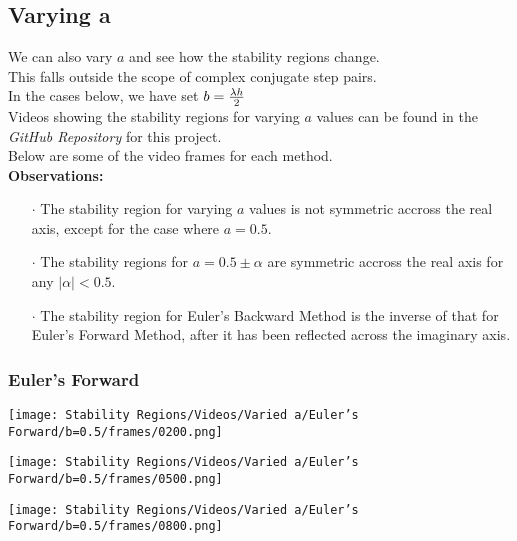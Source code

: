 \subsection{Varying a}
\par We can also vary $a$ and see how the stability regions change.\\
This falls outside the scope of complex conjugate step pairs.\\
In the cases below, we have set $b = \frac{\lambda h}{2}$\\
Videos showing the stability regions for varying $a$ values can be found in the \textit{GitHub Repository}\cite{GitHub_Repo} for this project.\\
Below are some of the video frames for each method.\\
\textbf{Observations:}
\begin{itemize}
	\item[$\cdot$] The stability region for varying $a$ values is not symmetric accross the real axis, except for the case where $a = 0.5$.
	\item[$\cdot$] The stability regions for $a = 0.5 \pm \alpha$ are symmetric accross the real axis for any $|\alpha| < 0.5$.
	\item[$\cdot$] The stability region for Euler's Backward Method is the inverse of that for Euler's Forward Method, after it has been reflected across the imaginary axis.
\end{itemize}
\subsubsection{Euler's Forward}
\begin{multicols}{3}
	\begin{center}
		\texttt{[image: Stability Regions/Videos/Varied a/Euler's Forward/b=0.5/frames/0200.png]}
	\end{center}
	\columnbreak{}
	\begin{center}
		\texttt{[image: Stability Regions/Videos/Varied a/Euler's Forward/b=0.5/frames/0500.png]}
	\end{center}
	\columnbreak{}
	\begin{center}
		\texttt{[image: Stability Regions/Videos/Varied a/Euler's Forward/b=0.5/frames/0800.png]}
	\end{center}
\end{multicols}
